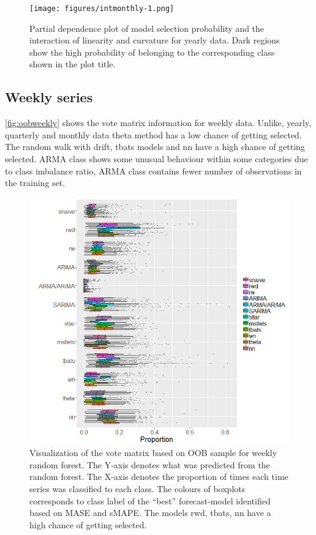 \documentclass[11pt,a4paper,]{article}
\begin{document}
\begin{figure}
\centering
\texttt{[image: figures/intmonthly-1.png]}
\caption{\label{fig:intmonthly}Partial dependence plot of model selection probability and the interaction of linearity and curvature for yearly data. Dark regions show the high probability of belonging to the corresponding class shown in the plot title.}
\end{figure}

\hypertarget{weekly-series}{%
\subsection{Weekly series}\label{weekly-series}}

\autoref{fig:oobweekly} shows the vote matrix information for weekly data. Unlike, yearly, quarterly and monthly data theta method has a low chance of getting selected. The random walk with drift, tbats models and nn have a high chance of getting selected. ARMA class shows some unusual behaviour within some categories due to class imbalance ratio, ARMA class contains fewer number of observations in the training set.

\begin{figure}
\centering
\includegraphics{figures/oobweekly-1.png}
\caption{\label{fig:oobweekly}Visualization of the vote matrix based on OOB sample for weekly random forest. The Y-axis denotes what was predicted from the random forest. The X-axis denotes the proportion of times each time series was classified to each class. The colours of boxplots corresponds to class label of the ``best'' forecast-model identified based on MASE and sMAPE. The models rwd, tbats, nn have a high chance of getting selected.}
\end{figure}
\end{document}
